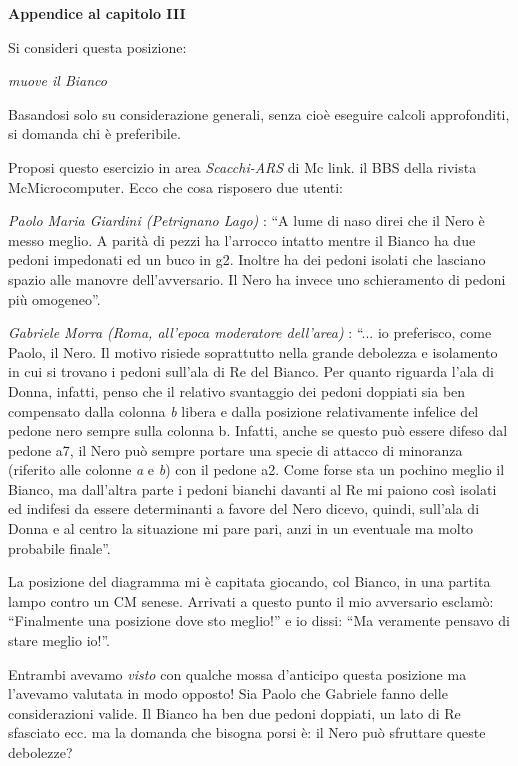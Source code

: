 \textbf{Appendice al capitolo III}

Si consideri questa posizione:


\emph{muove il Bianco}

Basandosi solo su considerazione generali, senza cioè eseguire calcoli
approfonditi, si domanda chi è preferibile.

Proposi questo esercizio in area \emph{Scacchi-ARS} di Mc link. il BBS
della rivista McMicrocomputer. Ecco che cosa risposero due utenti:

\emph{Paolo Maria Giardini (Petrignano Lago)} : ``A lume di naso direi
che il Nero è messo meglio. A parità di pezzi ha l'arrocco intatto
mentre il Bianco ha due pedoni impedonati ed un buco in g2. Inoltre ha
dei pedoni isolati che lasciano spazio alle manovre dell'avversario. Il
Nero ha invece uno schieramento di pedoni più omogeneo''.

\emph{Gabriele Morra (Roma, all'epoca moderatore dell'area)} : ``... io
preferisco, come Paolo, il Nero. Il motivo risiede soprattutto nella
grande debolezza e isolamento in cui si trovano i pedoni sull'ala di Re
del Bianco. Per quanto riguarda l'ala di Donna, infatti, penso che il
relativo svantaggio dei pedoni doppiati sia ben compensato dalla colonna
\emph{b} libera e dalla posizione relativamente infelice del pedone nero
sempre sulla colonna b. Infatti, anche se questo può essere difeso dal
pedone a7, il Nero può sempre portare una specie di attacco di minoranza
(riferito alle colonne \emph{a} e \emph{b}) con il pedone a2. Come forse
sta un pochino meglio il Bianco, ma dall'altra parte i pedoni bianchi
davanti al Re mi paiono così isolati ed indifesi da essere determinanti
a favore del Nero dicevo, quindi, sull'ala di Donna e al centro la
situazione mi pare pari, anzi in un eventuale ma molto probabile
finale''.

La posizione del diagramma mi è capitata giocando, col Bianco, in una
partita lampo contro un CM senese. Arrivati a questo punto il mio
avversario esclamò: ``Finalmente una posizione dove sto meglio!'' e io
dissi: ``Ma veramente pensavo di stare meglio io!''.

Entrambi avevamo \emph{visto} con qualche mossa d'anticipo questa
posizione ma l'avevamo valutata in modo opposto! Sia Paolo che Gabriele
fanno delle considerazioni valide. Il Bianco ha ben due pedoni doppiati,
un lato di Re sfasciato ecc. ma la domanda che bisogna porsi è: il Nero
può sfruttare queste debolezze?

